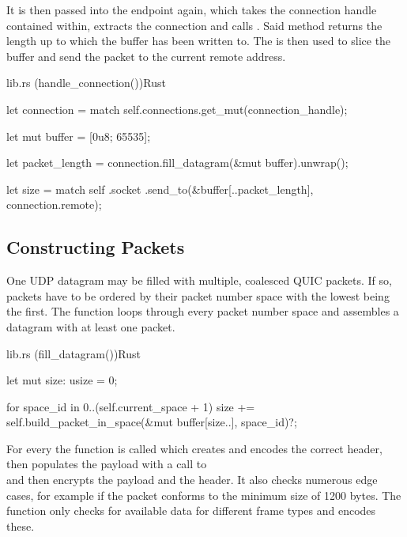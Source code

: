 It is then passed into the endpoint again, which takes the connection handle contained within, extracts the connection and calls
. Said method returns the length up to which the buffer has been written to. The 
is then used to slice the buffer and send the packet to the current remote address.

\begin{codeblock}{lib.rs (handle\_connection())}{Rust}
    \begin{rustcode}
        let connection = match self.connections.get_mut(connection_handle);

        let mut buffer = [0u8; 65535];

        let packet_length = connection.fill_datagram(&mut buffer).unwrap();

        let size = match self
            .socket
            .send_to(&buffer[..packet_length], connection.remote);
    \end{rustcode}
    \label{event_handling_endpoint}
\end{codeblock}

\subsection{Constructing Packets}

One UDP datagram may be filled with multiple, coalesced QUIC packets. If so, packets have to be ordered
by their packet number space with the lowest being the first. The function  loops
through every packet number space and assembles a datagram with at least one packet.

\begin{codeblock}{lib.rs (fill\_datagram())}{Rust}
    \begin{rustcode}
        let mut size: usize = 0;

        for space_id in 0..(self.current_space + 1) {
            size += self.build_packet_in_space(&mut buffer[size..], space_id)?;
        }
    \end{rustcode}
    \label{fill_datagram}
\end{codeblock}

For every  the function  is called which creates
and encodes the correct header, then populates the payload with a call to \\  and
then encrypts the payload and the header. It also checks numerous edge cases, for example if the packet conforms to the
minimum size of 1200 bytes. The function  only checks for available data for
different frame types and encodes these. 

